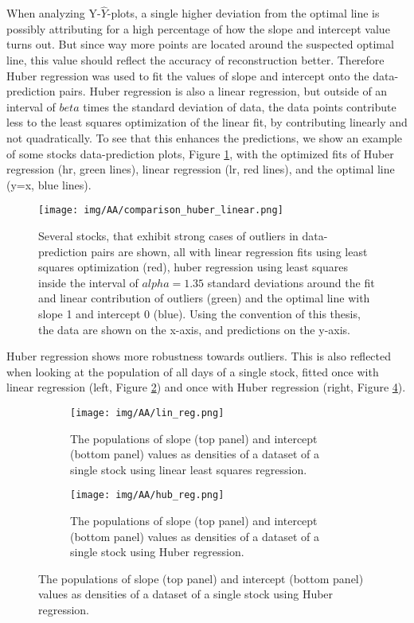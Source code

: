 When analyzing Y-$\hat{Y}$-plots, a single higher deviation from the optimal line is possibly attributing for a high percentage of how the slope and intercept value turns out. But since way more points are located around the suspected optimal line, this value should reflect the accuracy of reconstruction better. Therefore Huber regression was used to fit the values of slope and intercept onto the data-prediction pairs. Huber regression is also a linear regression, but outside of an interval of $beta$ times the standard deviation of data, the data points contribute less to the least squares optimization of the linear fit, by contributing linearly and not quadratically. To see that this enhances the predictions, we show an example of some stocks data-prediction plots, Figure \ref{fig:huber_stock_plots}, with the optimized fits of Huber regression (hr, green lines), linear regression (lr, red lines), and the optimal line (y=x, blue lines). 
\begin{figure}[h!]%
	\label{fig:huber_stock_plots}
	\centering
	\texttt{[image: img/AA/comparison\_huber\_linear.png]}
	\caption[Comparison Huber Regression on pair plots]
	{Several stocks, that exhibit strong cases of outliers in data-prediction pairs are shown, all with linear regression fits using least squares optimization (red), huber regression using least squares inside the interval of $alpha=1.35$ standard deviations around the fit and linear contribution of outliers (green) and the optimal line with slope 1 and intercept 0 (blue). Using the convention of this thesis, the data are shown on the x-axis, and predictions on the y-axis. }
\end{figure}
Huber regression shows more robustness towards outliers. This is also reflected when looking at the population of all days of a single stock, fitted once with linear regression (left, Figure \ref{fig:linear_reg_population}) and once with Huber regression (right, Figure \ref{fig:huber_reg_population}). 
\begin{figure}[h!]%
	\centering
	\begin{subfigure}[b]{0.45\textwidth}
		\texttt{[image: img/AA/lin\_reg.png]}
		\caption[Linear regression populations]{The populations of slope (top panel) and intercept (bottom panel) values as densities of a dataset of a single stock using linear least squares regression.}
		\label{fig:linear_reg_population}
	\end{subfigure}
	\begin{subfigure}[b]{0.45\textwidth}
		\texttt{[image: img/AA/hub\_reg.png]}
		\caption[Huber regression populations]{The populations of slope (top panel) and intercept (bottom panel) values as densities of a dataset of a single stock using Huber regression.}
		\label{fig:huber_reg_population}
	\end{subfigure}
\end{figure}
